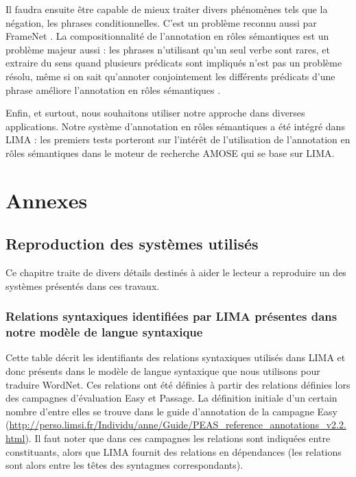 \documentclass[oneside,parskip]{scrbook}
\begin{document}
Il faudra ensuite être capable de mieux traiter divers phénomènes tels que la
négation, les phrases conditionnelles. C'est un problème reconnu aussi par
FrameNet \citep{baker2014framenet}. La compositionnalité de l'annotation en
rôles sémantiques est un problème majeur aussi : les phrases n'utilisant qu'un
seul verbe sont rares, et extraire du sens quand plusieurs prédicats sont
impliqués n'est pas un problème résolu, même si on sait qu'annoter
conjointement les différents prédicats d'une phrase améliore l'annotation en
rôles sémantiques \citep{yang2014multi}.

Enfin, et surtout, nous souhaitons utiliser notre approche dans diverses
applications. Notre système d'annotation en rôles sémantiques a été intégré
dans LIMA : les premiers tests porteront sur l'intérêt de l'utilisation de
l'annotation en rôles sémantiques dans le moteur de recherche AMOSE qui se base
sur LIMA.


\backmatter




\part{Annexes}

\chapter{Reproduction des systèmes utilisés}

Ce chapitre traite de divers détails destinés à aider le lecteur a reproduire
un des systèmes présentés dans ces travaux.

\section{Relations syntaxiques identifiées par LIMA présentes dans notre modèle
de langue syntaxique}
\label{relations_modele_langue}

Cette table décrit les identifiants des relations syntaxiques utilisés dans
LIMA et donc présents dans le modèle de langue syntaxique que nous utilisons
pour traduire WordNet. Ces relations ont été définies à partir des relations
définies lors des campagnes d'évaluation Easy et Passage. La définition
initiale d'un certain nombre d'entre elles se trouve dans le guide d'annotation
de la campagne Easy
(\url{http://perso.limsi.fr/Individu/anne/Guide/PEAS_reference_annotations_v2.2.html}).
Il faut noter que dans ces campagnes les relations sont indiquées entre
constituants, alors que LIMA fournit des relations en dépendances (les
relations sont alors entre les têtes des syntagmes correspondants).
\end{document}
